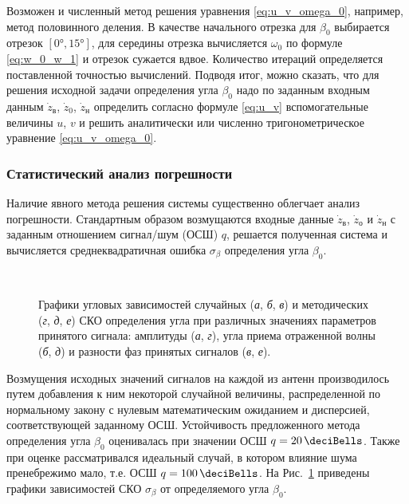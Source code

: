 \documentclass[../main.tex]{subfiles}
\begin{document}
Возможен и численный метод решения уравнения \eqref{eq:u_v_omega_0}, например, метод половинного деления. В качестве начального отрезка для $\beta_0$ выбирается отрезок $[\ang{0}, \ang{15}]$, для середины отрезка вычисляется  $\omega_0$ по формуле \eqref{eq:w_0_w_1} и отрезок сужается вдвое. Количество итераций определяется поставленной точностью вычислений. Подводя итог, можно сказать, что для решения исходной задачи определения угла $\beta_0$ надо по заданным входным данным $\dot{z}_\text{в}$, $\dot{z}_{0}$, $\dot{z}_\text{н}$ определить согласно формуле \eqref{eq:u_v} вспомогательные величины $u$, $v$ и решить аналитически или численно тригонометрическое уравнение \eqref{eq:u_v_omega_0}.

\subsubsection{Статистический анализ погрешности}\label{sec:stat}

Наличие явного метода решения системы существенно облегчает анализ погрешности. Стандартным образом возмущаются входные данные $\dot{z}_\text{в}$, $\dot{z}_{о}$ и $\dot{z}_\text{н}$ с заданным отношением сигнал/шум (ОСШ) $q$, решается полученная система и вычисляется среднеквадратичная ошибка $\sigma_\beta$ определения угла $\beta_0$.

\begin{figure}[tb]
  \centering
  \\

  \caption{Графики угловых зависимостей случайных (\textit{а}, \textit{б}, \textit{в}) и методических (\textit{г}, \textit{д}, \textit{е}) СКО определения угла при различных значениях параметров принятого сигнала: амплитуды (\textit{а}, \textit{г}), угла приема отраженной волны (\textit{б}, \textit{д}) и разности фаз принятых сигналов (\textit{в}, \textit{е}).}
  \label{fig:surface:pic2}
\end{figure}

Возмущения исходных значений сигналов на каждой из антенн производилось путем добавления к ним некоторой случайной величины, распределенной по нормальному закону с нулевым математическим ожиданием и дисперсией, соответствующей заданному ОСШ. Устойчивость предложенного метода определения угла $\beta_0$ оценивалась при значении ОСШ $q = \SI{20}{\deciBells}$. Также при оценке рассматривался идеальный случай, в котором влияние шума пренебрежимо мало, т.е. ОСШ $q = \SI{100}{\deciBells}$. На Рис.~\ref{fig:surface:pic2} приведены графики зависимостей СКО $\sigma_\beta$ от определяемого угла $\beta_0$.
\end{document}
